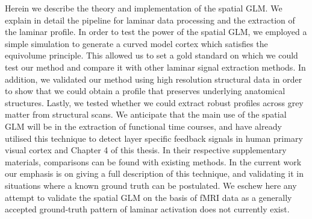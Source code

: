 Herein we describe the theory and implementation of the spatial GLM. We explain in detail the pipeline for laminar data processing and the extraction of the laminar profile. In order to test the power of the spatial GLM, we employed a simple simulation to generate a curved model cortex which satisfies the equivolume principle. This allowed us to set a gold standard on which we could test our method and compare it with other laminar signal extraction methods. In addition, we validated our method using high resolution structural data in order to show that we could obtain a profile that preserves underlying anatomical structures. Lastly, we tested whether we could extract robust profiles across grey matter from structural scans. We anticipate that the main use of the spatial GLM will be in the extraction of functional time courses, and have already utilised this technique to detect layer specific feedback signals in human primary visual cortex \cite{Kok2016} and Chapter 4 of this thesis. 
In their respective supplementary materials, comparisons can be found with existing methods. In the current work our emphasis is on giving a full description of this technique, and validating it in situations where a known ground truth can be postulated. We eschew here any attempt to validate the spatial GLM on the basis of fMRI data as a generally accepted ground-truth pattern of laminar activation does not currently exist.



